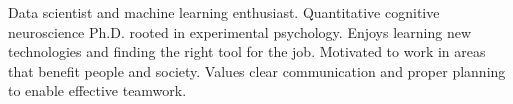 
\begin{cvparagraph}

Data scientist and machine learning enthusiast. Quantitative cognitive neuroscience Ph.D. rooted in experimental psychology. Enjoys learning new technologies and finding the right tool for the job. Motivated to work in areas that benefit people and society. Values clear communication and proper planning to enable effective teamwork.

\end{cvparagraph}
